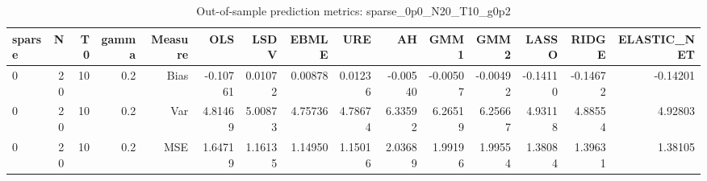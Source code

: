 \begin{table}[!htbp]\centering
\caption{Out-of-sample prediction metrics: sparse_0p0_N20_T10_g0p2}
\label{tab:table3_sparse_0p0_N20_T10_g0p2}
\begin{tabular}{lrrrrrrrrrrrrrr}
\hline
sparse & N & T0 & gamma & Measure & OLS & LSDV & EBMLE & URE & AH & GMM1 & GMM2 & LASSO & RIDGE & ELASTIC_NET \\
\hline
0 & 20 & 10 & 0.2 & Bias & -0.10761 & 0.01072 & 0.00878 & 0.01236 & -0.00540 & -0.00507 & -0.00492 & -0.14110 & -0.14672 & -0.14201 \\
0 & 20 & 10 & 0.2 & Var & 4.81469 & 5.00873 & 4.75736 & 4.78674 & 6.33592 & 6.26519 & 6.25667 & 4.93118 & 4.88554 & 4.92803 \\
0 & 20 & 10 & 0.2 & MSE & 1.64719 & 1.16135 & 1.14950 & 1.15016 & 2.03689 & 1.99196 & 1.99554 & 1.38084 & 1.39631 & 1.38105 \\
\hline
\end{tabular}
\end{table}


